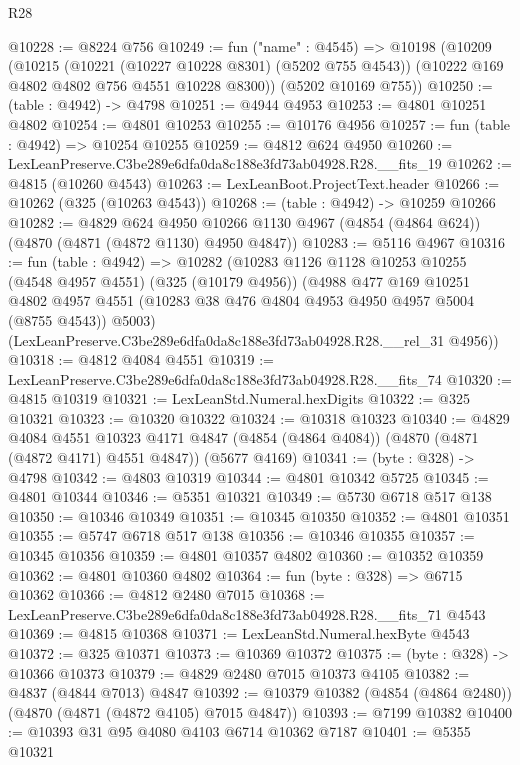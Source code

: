 \begin{lexlean}{R28}
\begin{coremodule}
@10228 := @8224 @756
@10249 := fun ("name" : @4545) =>
  @10198
    (@10209
      (@10215
        (@10221 (@10227 @10228 @8301) (@5202 @755 @4543))
        (@10222 @169 @4802 @4802 @756 @4551 @10228 @8300))
      (@5202 @10169 @755))
@10250 := (table : @4942) -> @4798
@10251 := @4944 @4953
@10253 := @4801 @10251 @4802
@10254 := @4801 @10253
@10255 := @10176 @4956
@10257 := fun (table : @4942) => @10254 @10255
@10259 := @4812 @624 @4950
@10260 := LexLeanPreserve.C3be289e6dfa0da8c188e3fd73ab04928.R28.__fits_19
@10262 := @4815 (@10260 @4543)
@10263 := LexLeanBoot.ProjectText.header
@10266 := @10262 (@325 (@10263 @4543))
@10268 := (table : @4942) -> @10259 @10266
@10282 := @4829
    @624
    @4950
    @10266
    @1130
    @4967
    (@4854 (@4864 @624))
    (@4870 (@4871 (@4872 @1130) @4950 @4847))
@10283 := @5116 @4967
@10316 := fun (table : @4942) =>
  @10282
    (@10283
      @1126
      @1128
      @10253
      @10255
      (@4548 @4957 @4551)
      (@325 (@10179 @4956))
      (@4988
        @477
        @169
        @10251
        @4802
        @4957
        @4551
        (@10283 @38 @476 @4804 @4953 @4950 @4957 @5004 (@8755 @4543))
        @5003)
      (LexLeanPreserve.C3be289e6dfa0da8c188e3fd73ab04928.R28.__rel_31 @4956))
@10318 := @4812 @4084 @4551
@10319 := LexLeanPreserve.C3be289e6dfa0da8c188e3fd73ab04928.R28.__fits_74
@10320 := @4815 @10319
@10321 := LexLeanStd.Numeral.hexDigits
@10322 := @325 @10321
@10323 := @10320 @10322
@10324 := @10318 @10323
@10340 := @4829
    @4084
    @4551
    @10323
    @4171
    @4847
    (@4854 (@4864 @4084))
    (@4870 (@4871 (@4872 @4171) @4551 @4847))
    (@5677 @4169)
@10341 := (byte : @328) -> @4798
@10342 := @4803 @10319
@10344 := @4801 @10342 @5725
@10345 := @4801 @10344
@10346 := @5351 @10321
@10349 := @5730 @6718 @517 @138
@10350 := @10346 @10349
@10351 := @10345 @10350
@10352 := @4801 @10351
@10355 := @5747 @6718 @517 @138
@10356 := @10346 @10355
@10357 := @10345 @10356
@10359 := @4801 @10357 @4802
@10360 := @10352 @10359
@10362 := @4801 @10360 @4802
@10364 := fun (byte : @328) => @6715 @10362
@10366 := @4812 @2480 @7015
@10368 := LexLeanPreserve.C3be289e6dfa0da8c188e3fd73ab04928.R28.__fits_71 @4543
@10369 := @4815 @10368
@10371 := LexLeanStd.Numeral.hexByte @4543
@10372 := @325 @10371
@10373 := @10369 @10372
@10375 := (byte : @328) -> @10366 @10373
@10379 := @4829 @2480 @7015 @10373 @4105
@10382 := @4837 (@4844 @7013) @4847
@10392 := @10379 @10382 (@4854 (@4864 @2480)) (@4870 (@4871 (@4872 @4105) @7015 @4847))
@10393 := @7199 @10382
@10400 := @10393 @31 @95 @4080 @4103 @6714 @10362 @7187
@10401 := @5355 @10321

\end{coremodule}
\end{lexlean}
